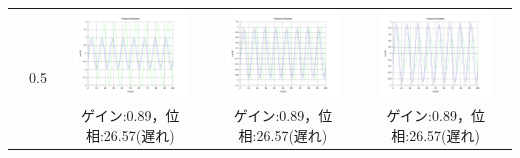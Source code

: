 \documentclass[a4paper,11pt]{jsarticle}
\begin{document}
\begin{enumerate}
\begin{table}[H]
\begin{tabular}{|c|c|c|c|c|}
            
            &
            \multirow{2}{*}{0.5} 
            & 
            \begin{minipage}{45mm}
              \centering
              \includegraphics[width=3cm,clip]{picture/2.png}
            \end{minipage}
            &
            \begin{minipage}{45mm}
              \centering
              \includegraphics[width=3cm,clip]{picture/5.png}
            \end{minipage}
            &
            \begin{minipage}{45mm}
              \centering
              \includegraphics[width=3cm,clip]{picture/8.png}
            \end{minipage} 
            \\\cline{3-5}

            
            &
            
            &
            ゲイン:0.89，位相:26.57(遅れ) 
            &
            ゲイン:0.89，位相:26.57(遅れ)
            &
            ゲイン:0.89，位相:26.57(遅れ) 
            \\\cline{2-5}


\end{tabular}
\end{table}
\end{enumerate}
\end{document}
